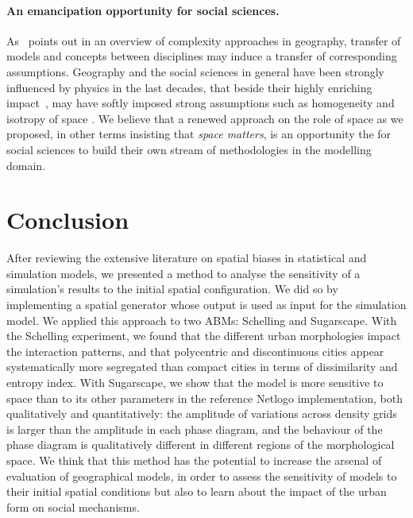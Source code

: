 \documentclass[preprint,5p,times,twocolumn,authoryear]{elsarticle}
\begin{document}
\paragraph{An emancipation opportunity for social sciences.}


As~\citet{pumain2003approche} points out in an overview of complexity approaches in geography, transfer of models and concepts between disciplines may induce a transfer of corresponding assumptions. Geography and the social sciences in general have been strongly influenced by physics in the last decades, that beside their highly enriching impact~\citep{o2015physicists}, may have softly imposed strong assumptions such as homogeneity and isotropy of space . We believe that a renewed approach on the role of space as we proposed, in other terms insisting that \emph{space matters}, is an opportunity the for social sciences to build their own stream of methodologies in the modelling domain.





\section{Conclusion}

After reviewing the extensive literature on spatial biases in statistical and simulation models, we presented a method to analyse the sensitivity of a simulation's results to the initial spatial configuration. We did so by implementing a spatial generator whose output is used as input for the simulation model. We applied this approach to two  ABMs: Schelling and Sugarscape. With the Schelling experiment, we found that the different urban morphologies impact the interaction patterns, and that polycentric and discontinuous cities appear systematically more segregated than compact cities in terms of dissimilarity and entropy index. With Sugarscape, we show that the model is more sensitive to space than to its other parameters in the reference Netlogo implementation, both qualitatively and quantitatively: the amplitude of variations across density grids is larger than the amplitude in each phase diagram, and the behaviour of the phase diagram is qualitatively different in different regions of the morphological space. We think that this method has the potential to increase the arsenal of evaluation of geographical models, in order to assess the sensitivity of models to their initial spatial conditions but also to learn about the impact of the urban form on social mechanisms.
\end{document}
